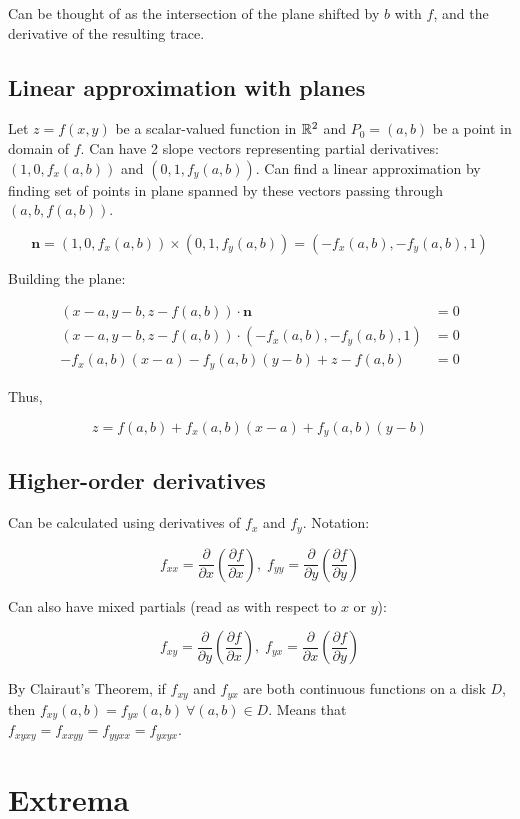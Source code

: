 Can be thought of as the intersection of the plane shifted by $b$ with $f$, and the derivative of the resulting trace.

\subsection{Linear approximation with planes}

Let $z=f(x,y)$ be a scalar-valued function in $\mathbb{R}^2$ and $P_0=(a,b)$ be a point in domain of $f$. Can have 2 slope vectors representing partial derivatives:
$(1,0,f_x(a,b))$ and $(0,1,f_y(a,b))$. Can find a linear approximation by finding set of points in plane spanned by these vectors passing through
$(a,b,f(a,b))$.

\[\textbf{n}=(1,0,f_x(a,b))\times(0,1,f_y(a,b))=(-f_x(a,b),-f_y(a,b),1)\]

Building the plane:

\begin{align*}
    (x-a, y-b, z-f(a, b)) \cdot \textbf{n} &=0 \\
    (x-a, y-b, z-f(a, b)) \cdot\left(-f_{x}(a, b),-f_{y}(a, b), 1\right) &=0 \\
    -f_{x}(a, b)(x-a)-f_{y}(a, b)(y-b)+z-f(a, b) &=0
\end{align*}

Thus,

\[z=f(a, b)+f_{x}(a, b)(x-a)+f_{y}(a, b)(y-b)\]

\subsection{Higher-order derivatives}

Can be calculated using derivatives of $f_x$ and $f_y$. Notation:

\[f_{xx}=\frac{\partial}{\partial x}(\frac{\partial f}{\partial x}),\; f_{yy}=\frac{\partial}{\partial y}(\frac{\partial f}{\partial y})\]

Can also have mixed partials (read as with respect to $x$ or $y$):

\[f_{xy}=\frac{\partial}{\partial y}(\frac{\partial f}{\partial x}),\; f_{yx}=\frac{\partial}{\partial x}(\frac{\partial f}{\partial y})\]

By Clairaut's Theorem, if $f_{xy}$ and $f_{yx}$ are both continuous functions on a disk $D$, then $f_{xy}(a,b)=f_{yx}(a,b)\: \forall (a,b)\in D$. Means that $f_{xyxy}=f_{xxyy}=f_{yyxx}=f_{yxyx}$.

\section{Extrema}

